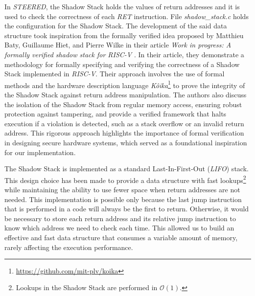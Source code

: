 In \textit{STEERED}, the Shadow Stack holds the values of return addresses and it
is used to check the correctness of each \textit{RET} instruction. File \textit{shadow\_stack.c}
holds the configuration for the Shadow Stack. The development of the said data structure
took inspiration from the formally verified idea proposed by Matthieu Baty,
Guillaume Hiet, and Pierre Wilke in their article \textit{Work in progress: A formally
verified shadow stack for RISC-V} \cite{shadowstack}. In their article, they
demonstrate a methodology for formally specifying and verifying the correctness
of a Shadow Stack implemented in \textit{RISC-V}. Their approach involves the
use of formal methods and the hardware description language \textit{Kôika}\footnote{\url{https://github.com/mit-plv/koika}}
to prove the integrity of the Shadow Stack against return address manipulation. The
authors also discuss the isolation of the Shadow Stack from regular memory access,
ensuring robust protection against tampering, and provide a verified framework that
halts execution if a violation is detected, such as a stack overflow or an
invalid return address. This rigorous approach highlights the importance of formal
verification in designing secure hardware systems, which served as a
foundational inspiration for our implementation.

The Shadow Stack is implemented as a standard Last-In-First-Out (\textit{LIFO}) stack.
This design choice has been made to provide a data structure with fast lookups\footnote{Lookups
in the Shadow Stack are performed in $\mathcal{O}(1)$.} while maintaining the ability
to use fewer space when return addresses are not needed. This implementation is
possible only because the last jump instruction that is performed in a code will
always be the first to return. Otherwise, it would be necessary to store each
return address and its relative jump instruction to know which address we need
to check each time. This allowed us to build an effective and fast data structure
that consumes a variable amount of memory, rarely affecting the execution
performance.

